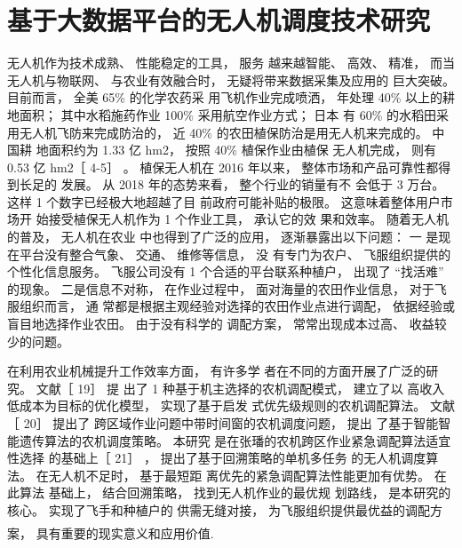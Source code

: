 \documentclass[UTF8,a4paper,10pt,nocolorlinks]{ctexart}
\newcommand{\upcite}[1]{\textsuperscript{\textsuperscript{\cite{#1}}}}
\begin{document}
    \section{基于大数据平台的无人机调度技术研究}
    无人机作为技术成熟、 性能稳定的工具， 服务
越来越智能、 高效、 精准， 而当无人机与物联网、
与农业有效融合时， 无疑将带来数据采集及应用的
巨大突破。 目前而言， 全美 65\% 的化学农药采
用飞机作业完成喷洒， 年处理 40\% 以上的耕地面积；
其中水稻施药作业 100\% 采用航空作业方式； 日本
有 60\% 的水稻田采用无人机飞防来完成防治的， 近
40\% 的农田植保防治是用无人机来完成的。 中国耕
地面积约为 1.33 亿 hm2， 按照 40\% 植保作业由植保
无人机完成， 则有 0.53 亿 hm2［ 4-5］ 。 植保无人机在
2016 年以来， 整体市场和产品可靠性都得到长足的
发展。 从 2018 年的态势来看， 整个行业的销量有不
会低于 3 万台。 这样 1 个数字已经极大地超越了目
前政府可能补贴的极限。 这意味着整体用户市场开
始接受植保无人机作为 1 个作业工具， 承认它的效
果和效率。 随着无人机的普及， 无人机在农业
中也得到了广泛的应用， 逐渐暴露出以下问题： 一
是现在平台没有整合气象、 交通、 维修等信息， 没
有专门为农户、 飞服组织提供的个性化信息服务。
飞服公司没有 1 个合适的平台联系种植户， 出现了
“找活难” 的现象。 二是信息不对称， 在作业过程中，
面对海量的农田作业信息， 对于飞服组织而言， 通
常都是根据主观经验对选择的农田作业点进行调配，
依据经验或盲目地选择作业农田。 由于没有科学的
调配方案， 常常出现成本过高、 收益较少的问题。\par
在利用农业机械提升工作效率方面， 有许多学
者在不同的方面开展了广泛的研究。 文献［ 19］ 提
出了 1 种基于机主选择的农机调配模式， 建立了以
高收入低成本为目标的优化模型， 实现了基于启发
式优先级规则的农机调配算法。 文献［ 20］ 提出了
跨区域作业问题中带时间窗的农机调度问题， 提出
了基于智能智能遗传算法的农机调度策略。 本研究
是在张璠的农机跨区作业紧急调配算法适宜性选择
的基础上［ 21］ ， 提出了基于回溯策略的单机多任务
的无人机调度算法。 在无人机不足时， 基于最短距
离优先的紧急调配算法性能更加有优势。 在此算法
基础上， 结合回溯策略， 找到无人机作业的最优规
划路线， 是本研究的核心。 实现了飞手和种植户的
供需无缝对接， 为飞服组织提供最优益的调配方案，
具有重要的现实意义和应用价值\upcite{uav1}.
\end{document}
